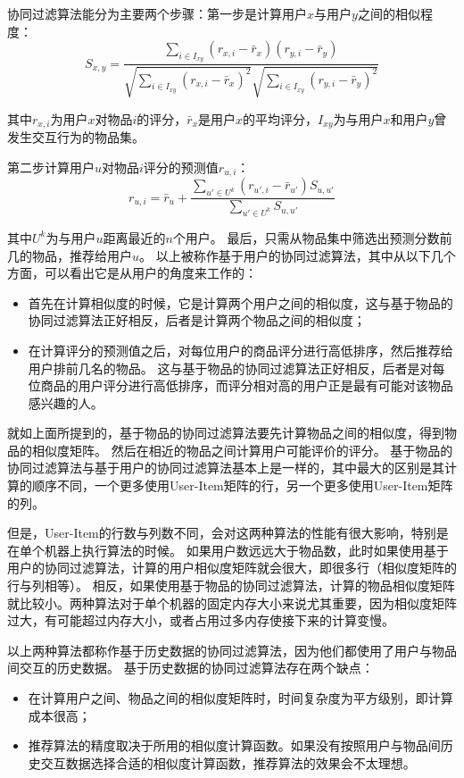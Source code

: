 协同过滤算法能分为主要两个步骤：第一步是计算用户$x$与用户$y$之间的相似程度：
\begin{equation}
S_{x,y} = \frac{\sum_{i\in I_{xy}}(r_{x,i}-\bar{r}_x)(r_{y,i}-\bar{r}_y)}{\sqrt{\sum_{i\in I_{xy}}(r_{x,i}-\bar{r}_x)^2}\sqrt{\sum_{i\in I_{xy}}(r_{y,i}-\bar{r}_y)^2}}
\end{equation}

其中$r_{x,i}$为用户$x$对物品$i$的评分，$\bar{r}_x$是用户$x$的平均评分，$I_{xy}$为与用户$x$和用户$y$曾发生交互行为的物品集。

第二步计算用户$u$对物品$i$评分的预测值$r_{u,i}$：
\begin{equation}
r_{u,i} = \bar{r}_u + \frac{\sum_{u'\in U^k}(r_{u',i}-\bar{r}_{u'})S_{u,u'}}{\sum_{u'\in U^k}S_{u,u'}}
\end{equation}

其中$U^k$为与用户$u$距离最近的$n$个用户。
最后，只需从物品集中筛选出预测分数前几的物品，推荐给用户$u$。
以上被称作基于用户的协同过滤算法，其中从以下几个方面，可以看出它是从用户的角度来工作的：
\begin{itemize}
\item 首先在计算相似度的时候，它是计算两个用户之间的相似度，这与基于物品的协同过滤算法正好相反，后者是计算两个物品之间的相似度；
\item 在计算评分的预测值之后，对每位用户的商品评分进行高低排序，然后推荐给用户排前几名的物品。
这与基于物品的协同过滤算法正好相反，后者是对每位商品的用户评分进行高低排序，而评分相对高的用户正是最有可能对该物品感兴趣的人。
\end{itemize}

就如上面所提到的，基于物品的协同过滤算法要先计算物品之间的相似度，得到物品的相似度矩阵。
然后在相近的物品之间计算用户可能评价的评分。
基于物品的协同过滤算法与基于用户的协同过滤算法基本上是一样的，其中最大的区别是其计算的顺序不同，一个更多使用User-Item矩阵的行，另一个更多使用User-Item矩阵的列。

但是，User-Item的行数与列数不同，会对这两种算法的性能有很大影响，特别是在单个机器上执行算法的时候。
如果用户数远远大于物品数，此时如果使用基于用户的协同过滤算法，计算的用户相似度矩阵就会很大，即很多行（相似度矩阵的行与列相等）。
相反，如果使用基于物品的协同过滤算法，计算的物品相似度矩阵就比较小。两种算法对于单个机器的固定内存大小来说尤其重要，因为相似度矩阵过大，有可能超过内存大小，或者占用过多内存使接下来的计算变慢。

以上两种算法都称作基于历史数据的协同过滤算法，因为他们都使用了用户与物品间交互的历史数据。
基于历史数据的协同过滤算法存在两个缺点：
\begin{itemize}
\item 在计算用户之间、物品之间的相似度矩阵时，时间复杂度为平方级别，即计算成本很高；
\item 推荐算法的精度取决于所用的相似度计算函数。如果没有按照用户与物品间历史交互数据选择合适的相似度计算函数，推荐算法的效果会不太理想。
\end{itemize}

